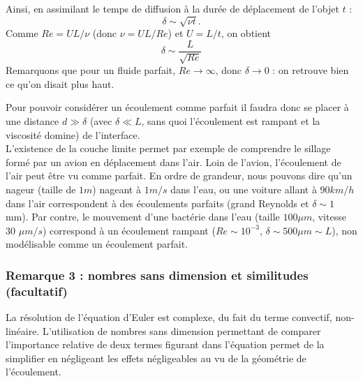 \documentclass[11pt,a4paper]{report}
\begin{document}
Ainsi, en assimilant le temps de diffusion à la durée de déplacement de l'objet $t$ :
\begin{equation}
	\delta \sim \sqrt{\nu t}.
\end{equation}
Comme $Re = UL/\nu$ (donc $\nu = UL/Re$) et $U = L/t$, on obtient
\begin{equation}
	\delta \sim \frac{L}{\sqrt{Re}}
\end{equation}
Remarquons que pour un fluide parfait, $Re \rightarrow \infty$, donc $\delta \rightarrow 0$ : on retrouve bien ce qu'on disait plus haut.

Pour pouvoir considérer un écoulement comme parfait il faudra donc se placer à une distance $d \gg \delta$ (avec $\delta \ll L$, sans quoi l'écoulement est rampant et la viscosité domine) de l’interface.\\

L’existence de la couche limite permet par exemple de comprendre le sillage formé par un avion en déplacement dans l'air. Loin de l'avion, l'écoulement de l'air peut être vu comme parfait. En ordre de grandeur, nous pouvons dire qu’un nageur (taille de $1m$) nageant à $1m/s$ dans l’eau, ou une voiture allant à $90km/h$ dans l’air correspondent à des écoulements parfaits (grand Reynolds et $\delta \sim 1$ mm). Par contre, le mouvement d'une bactérie dans l'eau (taille $100 \mu m$, vitesse 30 $\mu m/s$) correspond à un écoulement rampant ($Re\sim 10^{-3}$, $\delta \sim 500 \mu m \sim L$), non modélisable comme un écoulement parfait. 

\subsubsection{Remarque 3 : nombres sans dimension et similitudes (facultatif)}

La résolution de l'équation d'Euler est complexe, du fait du terme convectif, non-linéaire. L'utilisation de nombres sans dimension permettant de comparer l'importance relative de deux termes figurant dans l'équation permet de la simplifier en négligeant les effets négligeables au vu de la géométrie de l'écoulement.\\
\end{document}
